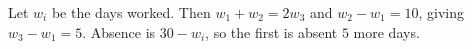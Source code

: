 Let $w_i$ be the days worked. Then $w_1+w_2=2w_3$ and $w_2-w_1=10$, giving $w_3-w_1=5$. Absence is $30-w_i$, so the first is absent $\boxed5$ more days.
